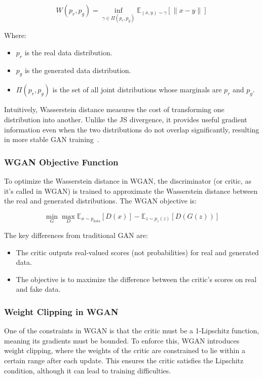 \[
W(p_r, p_g) = \inf_{\gamma \in \Pi(p_r, p_g)} \mathbb{E}_{(x,y) \sim \gamma}[\|x - y\|]
\]

Where:
\begin{itemize}
    \item \( p_r \) is the real data distribution.
    \item \( p_g \) is the generated data distribution.
    \item \( \Pi(p_r, p_g) \) is the set of all joint distributions whose marginals are \( p_r \) and \( p_g \).
\end{itemize}

Intuitively, Wasserstein distance measures the cost of transforming one distribution into another. Unlike the JS divergence, it provides useful gradient information even when the two distributions do not overlap significantly, resulting in more stable GAN training~\cite{adler2018banach}.

\subsubsection{WGAN Objective Function}
To optimize the Wasserstein distance in WGAN, the discriminator (or critic, as it's called in WGAN) is trained to approximate the Wasserstein distance between the real and generated distributions. The WGAN objective is:

\[
\min_G \max_D \mathbb{E}_{x \sim p_{\text{data}}} [D(x)] - \mathbb{E}_{z \sim p_z(z)} [D(G(z))]
\]

The key differences from traditional GAN are:
\begin{itemize}
    \item The critic outputs real-valued scores (not probabilities) for real and generated data.
    \item The objective is to maximize the difference between the critic's scores on real and fake data.
\end{itemize}

\subsubsection{Weight Clipping in WGAN}
One of the constraints in WGAN is that the critic must be a 1-Lipschitz function, meaning its gradients must be bounded. To enforce this, WGAN introduces weight clipping, where the weights of the critic are constrained to lie within a certain range after each update. This ensures the critic satisfies the Lipschitz condition, although it can lead to training difficulties.

